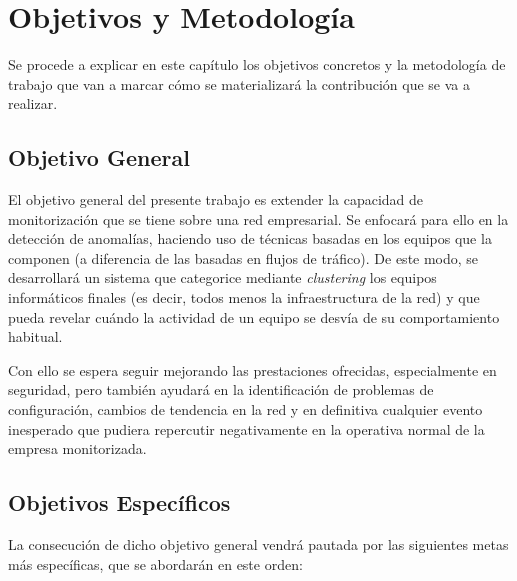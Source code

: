 \chapter{Objetivos y Metodología}\label{chap:objetivos}

Se procede a explicar en este capítulo los objetivos concretos y la metodología de trabajo que van a marcar cómo se materializará la contribución que se va a realizar.

\section{Objetivo General}\label{sec:objgeneral}
El objetivo general del presente trabajo es extender la capacidad de monitorización que se tiene sobre una red empresarial.
Se enfocará para ello en la detección de anomalías, haciendo uso de técnicas basadas en los equipos que la componen (a diferencia de las basadas en flujos de tráfico).
De este modo, se desarrollará un sistema que categorice mediante \emph{clustering} los equipos informáticos finales (es decir, todos menos la infraestructura de la red)
y que pueda revelar cuándo la actividad de un equipo se desvía de su comportamiento habitual.

Con ello se espera seguir mejorando las prestaciones ofrecidas, especialmente en seguridad, pero también ayudará en la identificación de problemas de configuración, cambios de tendencia en la red y en definitiva cualquier evento inesperado que pudiera repercutir negativamente en la operativa normal de la empresa monitorizada.

\section{Objetivos Específicos}\label{sec:objespecificos}
La consecución de dicho objetivo general vendrá pautada por las siguientes metas más específicas, que se abordarán en este orden:

